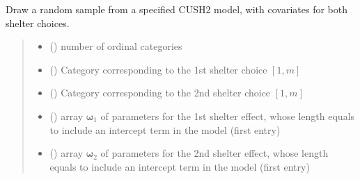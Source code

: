 \documentclass[letterpaper,10pt,english]{sphinxmanual}
\begin{document}
\begin{fulllineitems}
\label{\detokenize{cubmods:cubmods.cush2_xx.draw}}
\pysigstartsignatures
{}
\pysigstopsignatures
\sphinxAtStartPar
Draw a random sample from a specified CUSH2 model,
with covariates for both shelter choices.
\begin{quote}\begin{description}
\begin{itemize}
\item {} 
\sphinxAtStartPar
{} () \textendash{} number of ordinal categories

\item {} 
\sphinxAtStartPar
{} () \textendash{} Category corresponding to the 1st shelter choice \([1,m]\)

\item {} 
\sphinxAtStartPar
{} () \textendash{} Category corresponding to the 2nd shelter choice \([1,m]\)

\item {} 
\sphinxAtStartPar
{} () \textendash{} array \(\pmb \omega_1\) of parameters for the 1st shelter effect, whose length equals 
 to include an intercept term in the model (first entry)

\item {} 
\sphinxAtStartPar
{} () \textendash{} array \(\pmb \omega_2\) of parameters for the 2nd shelter effect, whose length equals 
 to include an intercept term in the model (first entry)


\end{itemize}
\end{description}
\end{quote}
\end{fulllineitems}
\end{document}
